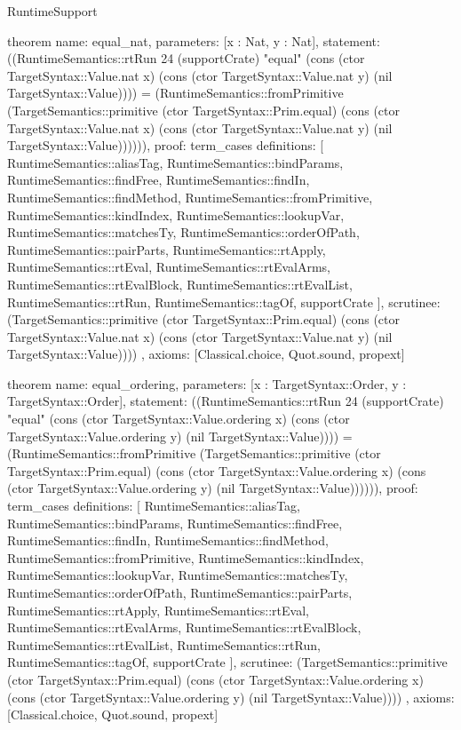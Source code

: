 \begin{lexlean}{RuntimeSupport}
\begin{semanticmodule}
theorem{
  name: equal_nat,
  parameters: [x : Nat, y : Nat],
  statement: ((RuntimeSemantics::rtRun 24 (supportCrate) "equal" (cons (ctor TargetSyntax::Value.nat x) (cons (ctor TargetSyntax::Value.nat y) (nil TargetSyntax::Value)))) = (RuntimeSemantics::fromPrimitive (TargetSemantics::primitive (ctor TargetSyntax::Prim.equal) (cons (ctor TargetSyntax::Value.nat x) (cons (ctor TargetSyntax::Value.nat y) (nil TargetSyntax::Value)))))),
  proof: term_cases{
    definitions: [
      RuntimeSemantics::aliasTag,
      RuntimeSemantics::bindParams,
      RuntimeSemantics::findFree,
      RuntimeSemantics::findIn,
      RuntimeSemantics::findMethod,
      RuntimeSemantics::fromPrimitive,
      RuntimeSemantics::kindIndex,
      RuntimeSemantics::lookupVar,
      RuntimeSemantics::matchesTy,
      RuntimeSemantics::orderOfPath,
      RuntimeSemantics::pairParts,
      RuntimeSemantics::rtApply,
      RuntimeSemantics::rtEval,
      RuntimeSemantics::rtEvalArms,
      RuntimeSemantics::rtEvalBlock,
      RuntimeSemantics::rtEvalList,
      RuntimeSemantics::rtRun,
      RuntimeSemantics::tagOf,
      supportCrate
    ],
    scrutinee: (TargetSemantics::primitive (ctor TargetSyntax::Prim.equal) (cons (ctor TargetSyntax::Value.nat x) (cons (ctor TargetSyntax::Value.nat y) (nil TargetSyntax::Value))))
  },
  axioms: [Classical.choice, Quot.sound, propext]
}

theorem{
  name: equal_ordering,
  parameters: [x : TargetSyntax::Order, y : TargetSyntax::Order],
  statement: ((RuntimeSemantics::rtRun 24 (supportCrate) "equal" (cons (ctor TargetSyntax::Value.ordering x) (cons (ctor TargetSyntax::Value.ordering y) (nil TargetSyntax::Value)))) = (RuntimeSemantics::fromPrimitive (TargetSemantics::primitive (ctor TargetSyntax::Prim.equal) (cons (ctor TargetSyntax::Value.ordering x) (cons (ctor TargetSyntax::Value.ordering y) (nil TargetSyntax::Value)))))),
  proof: term_cases{
    definitions: [
      RuntimeSemantics::aliasTag,
      RuntimeSemantics::bindParams,
      RuntimeSemantics::findFree,
      RuntimeSemantics::findIn,
      RuntimeSemantics::findMethod,
      RuntimeSemantics::fromPrimitive,
      RuntimeSemantics::kindIndex,
      RuntimeSemantics::lookupVar,
      RuntimeSemantics::matchesTy,
      RuntimeSemantics::orderOfPath,
      RuntimeSemantics::pairParts,
      RuntimeSemantics::rtApply,
      RuntimeSemantics::rtEval,
      RuntimeSemantics::rtEvalArms,
      RuntimeSemantics::rtEvalBlock,
      RuntimeSemantics::rtEvalList,
      RuntimeSemantics::rtRun,
      RuntimeSemantics::tagOf,
      supportCrate
    ],
    scrutinee: (TargetSemantics::primitive (ctor TargetSyntax::Prim.equal) (cons (ctor TargetSyntax::Value.ordering x) (cons (ctor TargetSyntax::Value.ordering y) (nil TargetSyntax::Value))))
  },
  axioms: [Classical.choice, Quot.sound, propext]
}


\end{semanticmodule}
\end{lexlean}

